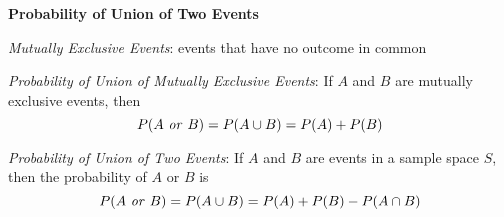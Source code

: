 \begin{center}
\textbf{Probability of Union of Two Events
}
\end{center}

\vspace*{1ex}

\emph{Mutually Exclusive Events}: events that have no outcome in common 


\emph{Probability of Union of Mutually Exclusive Events}:
If $A$ and $B$ are mutually exclusive events, then
\[
P(A \text{ \emph{or} } B) = P (A \cup B) = P(A) + P(B)
\] 

\vspace*{0.7ex}

\emph{Probability of Union of Two Events}: 
If $A$ and $B$ are events in a sample space $S$, then the probability of $A$ or $B$ is
\[
P(A \text{ \emph{or} } B) = P (A \cup B) = P(A) + P(B) - P(A\cap B)
\] 



